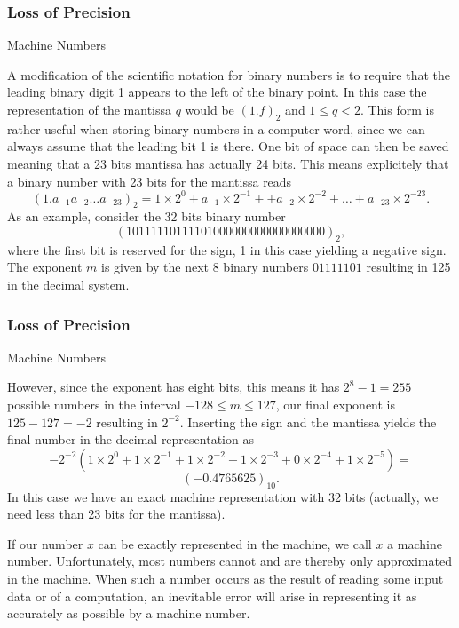 \documentclass[compress]{beamer}
\begin{document}
\frame
{
  \frametitle{Loss of Precision}
  \begin{block}{Machine Numbers}
\begin{small}
{\scriptsize
A modification of the scientific notation for binary numbers is to
require that the leading binary digit 1 appears to the left of the binary point.
In this case the representation of the mantissa $q$ would be
$(1.f)_2$ and $ 1 \le q < 2$. This form is rather useful when storing
binary numbers in a computer word, since we can always assume that the leading
bit 1 is there. One bit of space can then be saved meaning that a 23 bits
mantissa has actually 24 bits. This means explicitely that a binary number with 23 bits
for the mantissa reads
\begin{equation}
(1.a_{-1}a_{-2}\dots a_{-23})_2=1\times 2^0+a_{-1}\times 2^{-1}+
+a_{-2}\times 2^{-2}+\dots+a_{-23}\times 2^{-23}.
\end{equation}
As an example, consider the 32 bits binary number
\[
(10111110111101000000000000000000)_2,
\]
where the first bit is reserved for the sign, 1 in this case yielding a
negative sign. The exponent $m$ is given by the next 8 binary numbers
$01111101$ resulting in 125 in the decimal system.
}
\end{small}
  \end{block}
}


\frame
{
  \frametitle{Loss of Precision}
  \begin{block}{Machine Numbers}
\begin{small}
{\scriptsize
However, since the
exponent has eight bits, this means it has  $2^8-1=255$ possible numbers in the interval
$-128 \le m \le 127$, our final
exponent is $125-127=-2$ resulting in $2^{-2}$.
Inserting the sign and the mantissa yields the final number in the decimal representation as
\[
 -2^{-2}\left(1\times 2^0+1\times 2^{-1}+
1\times 2^{-2}+1\times 2^{-3}+0\times 2^{-4}+1\times 2^{-5}\right)=\]
\[
(-0.4765625)_{10}.
\]
In this case we have an exact machine representation with 32 bits (actually, we need less than
23 bits for the mantissa).


If our number $x$ can be exactly represented in the machine, we call
$x$ a machine number. Unfortunately, most numbers cannot  and are thereby
only approximated in the machine. When such a number occurs as the result
of reading some input data or of a computation, an inevitable error
will arise in representing it as accurately as possible by
a machine number.
}
\end{small}
  \end{block}
}
\end{document}
